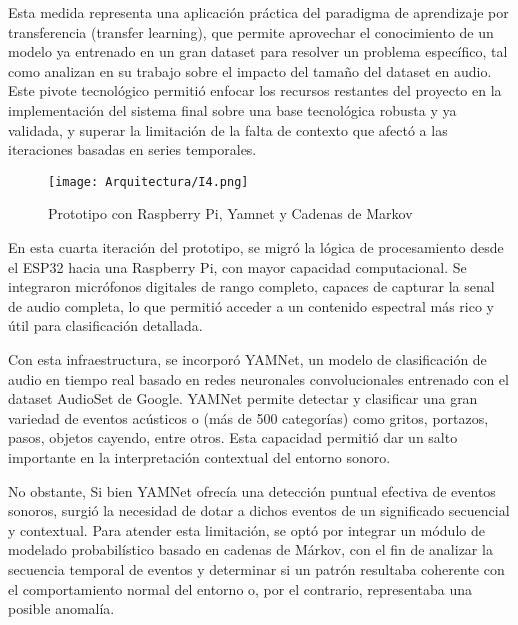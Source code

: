 Esta medida representa una aplicación práctica del paradigma de aprendizaje por transferencia (transfer learning), que permite aprovechar el conocimiento de un modelo ya entrenado en un gran dataset para resolver un problema específico, tal como analizan \citeauthor{pons2019deep} \citeyear{pons2019deep} en su trabajo sobre el impacto del tamaño del dataset en audio. Este pivote tecnológico permitió enfocar los recursos restantes del proyecto en la implementación del sistema final sobre una base tecnológica robusta y ya validada, y superar la limitación de la falta de contexto que afectó a las iteraciones basadas en series temporales.


      \begin{figure}[ht!]
            \centering
            \texttt{[image: Arquitectura/I4.png]}
            \caption{Prototipo con Raspberry Pi, Yamnet y Cadenas de Markov}
            \label{fig:prototipo4}
      \end{figure}

      En esta cuarta iteración del prototipo, se migró la lógica de procesamiento desde el ESP32 hacia una Raspberry Pi, con mayor capacidad computacional. Se integraron micrófonos digitales de rango completo, capaces de capturar la senal de audio completa, lo que permitió acceder a un contenido espectral más rico y útil para clasificación detallada.

      Con esta infraestructura, se incorporó YAMNet, un modelo de clasificación de audio en tiempo real basado en redes neuronales convolucionales entrenado con el dataset AudioSet de Google. YAMNet permite detectar y clasificar una gran variedad de eventos acústicos o (más de 500 categorías) como gritos, portazos, pasos, objetos cayendo, entre otros. Esta capacidad permitió dar un salto importante en la interpretación contextual del entorno sonoro.

      No obstante, Si bien YAMNet ofrecía una detección puntual efectiva de eventos sonoros, surgió la necesidad de dotar a dichos eventos de un significado secuencial y contextual. Para atender esta limitación, se optó por integrar un módulo de modelado probabilístico basado en cadenas de Márkov, con el fin de analizar la secuencia temporal de eventos y determinar si un patrón resultaba coherente con el comportamiento normal del entorno o, por el contrario, representaba una posible anomalía.

